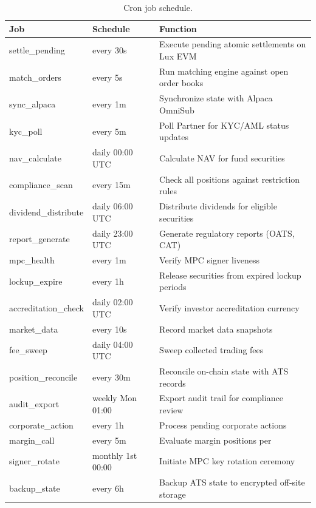 \begin{table}[H]
\centering
\caption{Cron job schedule.}
\label{tab:crons}
\begin{tabular}{llp{5.5cm}}
\toprule
\textbf{Job} & \textbf{Schedule} & \textbf{Function} \\
\midrule
settle\_pending & every 30s & Execute pending atomic settlements on Lux EVM \\
match\_orders & every 5s & Run matching engine against open order books \\
sync\_alpaca & every 1m & Synchronize state with Alpaca OmniSub \\
kyc\_poll & every 5m & Poll Partner for KYC/AML status updates \\
nav\_calculate & daily 00:00 UTC & Calculate NAV for fund securities \\
compliance\_scan & every 15m & Check all positions against restriction rules \\
dividend\_distribute & daily 06:00 UTC & Distribute dividends for eligible securities \\
report\_generate & daily 23:00 UTC & Generate regulatory reports (OATS, CAT) \\
mpc\_health & every 1m & Verify MPC signer liveness \\
lockup\_expire & every 1h & Release securities from expired lockup periods \\
accreditation\_check & daily 02:00 UTC & Verify investor accreditation currency \\
market\_data & every 10s & Record market data snapshots \\
fee\_sweep & daily 04:00 UTC & Sweep collected trading fees \\
position\_reconcile & every 30m & Reconcile on-chain state with ATS records \\
audit\_export & weekly Mon 01:00 & Export audit trail for compliance review \\
corporate\_action & every 1h & Process pending corporate actions \\
margin\_call & every 5m & Evaluate margin positions per \cite{lux-credit-protocol-spec} \\
signer\_rotate & monthly 1st 00:00 & Initiate MPC key rotation ceremony \\
backup\_state & every 6h & Backup ATS state to encrypted off-site storage \\
\bottomrule
\end{tabular}
\end{table}

